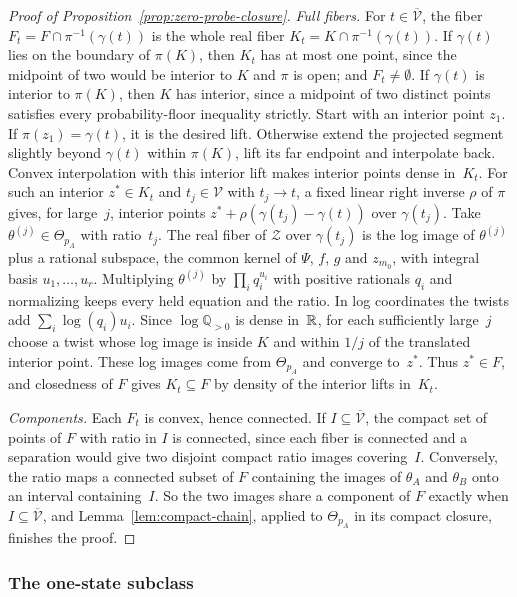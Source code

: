 \begin{proof}[Proof of Proposition~\ref{prop:zero-probe-closure}]
\emph{Full fibers.} For $t\in\overline{\mathcal V}$, the fiber
$F_t=F\cap\pi^{-1}(\gamma(t))$ is the whole real fiber
$K_t=K\cap\pi^{-1}(\gamma(t))$. If $\gamma(t)$ lies on the boundary of
$\pi(K)$, then $K_t$ has at most one point, since the midpoint of two would
be interior to $K$ and $\pi$ is open; and $F_t\neq\emptyset$.
If $\gamma(t)$ is interior to $\pi(K)$, then $K$ has interior, since a
midpoint of two distinct points satisfies every probability-floor
inequality strictly. Start with an interior point $z_1$. If
$\pi(z_1)=\gamma(t)$, it is the desired lift. Otherwise extend the
projected segment slightly beyond $\gamma(t)$ within $\pi(K)$, lift its far
endpoint and interpolate back. Convex interpolation with this interior lift
makes interior points dense in~$K_t$. For such an interior $z^*\in K_t$
and $t_j\in\mathcal V$ with $t_j\to t$, a fixed linear right inverse $\rho$
of $\pi$ gives, for large~$j$, interior points
$z^*+\rho(\gamma(t_j)-\gamma(t))$ over $\gamma(t_j)$. Take
$\theta^{(j)}\in\Theta_{p_A}$ with ratio~$t_j$. The real fiber of
$\mathcal Z$ over $\gamma(t_j)$ is the log image of $\theta^{(j)}$ plus a
rational subspace, the common kernel of $\Psi$, $f$, $g$ and $z_{m_0}$, with
integral basis $u_1,\dots,u_r$. Multiplying $\theta^{(j)}$ by
$\prod_iq_i^{u_i}$ with positive rationals $q_i$ and normalizing keeps every held equation and the ratio. In log
coordinates the twists add $\sum_i\log(q_i)u_i$. %
Since $\log\mathbb Q_{>0}$ is dense in~$\mathbb{R}$, for each sufficiently large~$j$
choose a twist whose log image is inside $K$ and within $1/j$ of the
translated interior point. These log images come from $\Theta_{p_A}$ and
converge to~$z^*$. Thus $z^*\in F$, and closedness of $F$ gives
$K_t\subseteq F$ by density of the interior lifts in~$K_t$.

\emph{Components.} Each $F_t$ is convex, hence connected. If
$I\subseteq\overline{\mathcal V}$, the compact set of points of $F$ with
ratio in $I$ is connected, since each fiber is connected and a separation would give two disjoint compact ratio images covering~$I$. Conversely,
the ratio maps a connected subset of $F$ containing the images of
$\theta_A$ and $\theta_B$ onto an interval containing~$I$. So the two
images share a component of $F$ exactly when
$I\subseteq\overline{\mathcal V}$, and Lemma~\ref{lem:compact-chain},
applied to $\Theta_{p_A}$ in its compact closure, finishes the proof.
\end{proof}

\subsubsection{The one-state subclass}\label{app:one-state}

